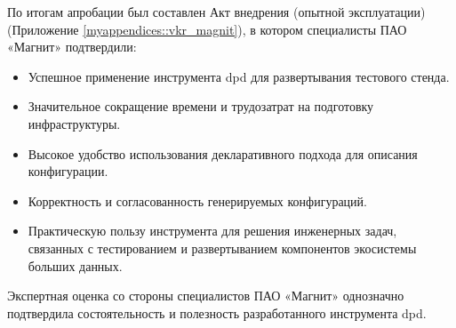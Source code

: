 По итогам апробации был составлен Акт внедрения (опытной эксплуатации) (Приложение \ref{myappendices::vkr_magnit}), в котором специалисты ПАО «Магнит» подтвердили:
\begin{itemize} 
\item Успешное применение инструмента dpd для развертывания тестового стенда.
\item Значительное сокращение времени и трудозатрат на подготовку инфраструктуры.
\item Высокое удобство использования декларативного подхода для описания конфигурации.
\item Корректность и согласованность генерируемых конфигураций.
\item Практическую пользу инструмента для решения инженерных задач, связанных с тестированием и развертыванием компонентов экосистемы больших данных.
\end{itemize}
Экспертная оценка со стороны специалистов ПАО «Магнит» однозначно подтвердила состоятельность и полезность разработанного инструмента dpd.